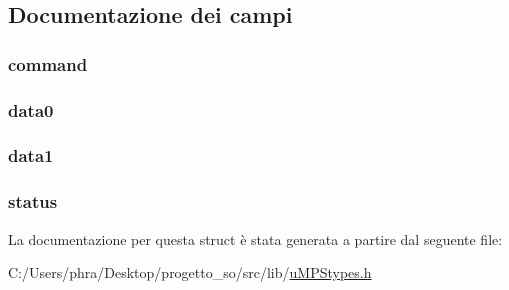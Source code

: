 \subsection{Documentazione dei campi}
\hypertarget{structdtpreg__t_a8538fdce575b580097b18700c560a5a8}{
\subsubsection[{command}]{ command}}\label{structdtpreg__t_a8538fdce575b580097b18700c560a5a8}
\hypertarget{structdtpreg__t_a8a0c321ffd2847534bfd0bc849a972b4}{
\subsubsection[{data0}]{ data0}}\label{structdtpreg__t_a8a0c321ffd2847534bfd0bc849a972b4}
\hypertarget{structdtpreg__t_a6eef7e2e6f5e38b7d153e3f25d6fefb8}{
\subsubsection[{data1}]{ data1}}\label{structdtpreg__t_a6eef7e2e6f5e38b7d153e3f25d6fefb8}
\hypertarget{structdtpreg__t_ae37efb991e613c0dc476ece5ed4ffa71}{
\subsubsection[{status}]{ status}}\label{structdtpreg__t_ae37efb991e613c0dc476ece5ed4ffa71}


La documentazione per questa struct è stata generata a partire dal seguente file\-:\begin{DoxyCompactItemize}
\item 
C\-:/\-Users/phra/\-Desktop/progetto\-\_\-so/src/lib/\hyperlink{u_m_p_stypes_8h}{u\-M\-P\-Stypes.\-h}\end{DoxyCompactItemize}
